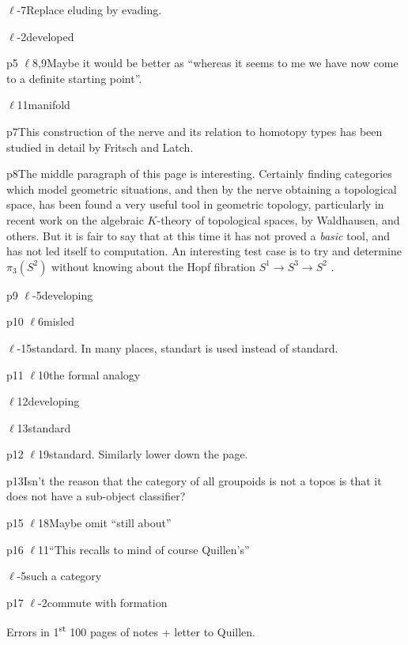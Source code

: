 $\ell$-7\qquad Replace eluding by evading.

$\ell$-2\qquad developed

p5 $\ell$8,9\quad Maybe it would be better as ``whereas it seems to me we have now come to a definite starting point''.

$\ell$11\qquad manifold

p7\qquad This construction of the nerve and its relation to homotopy types has been studied in detail by Fritsch and Latch.

p8\qquad The middle paragraph of this page is interesting. Certainly finding categories which model geometric situations, and then by the nerve obtaining a topological
space, has been found a very useful tool in geometric topology, particularly in recent work on the algebraic $K$-theory of topological spaces, by Waldhausen, and others. But it is fair to say that at this time it has not proved a \textit{basic} tool, and has not led itself to computation. An interesting test case is to try and determine $\pi_{3}(S^{2})$ without knowing about the Hopf fibration $S^{1}\to S^{3}\to S^{2}$ .

p9 $\ell$-5\qquad developing

p10 $\ell$6\qquad misled

$\ell$-15\quad standard. In many places, standart is used instead of standard.

p11 $\ell$10\quad the formal analogy

$\ell$12\qquad developing

$\ell$13\qquad standard

p12 $\ell$19\quad standard. Similarly lower down the page.

p13\qquad Isn't the reason that the category of all groupoids is not a topos is that it does not have a sub-object classifier?

p15 $\ell$18\quad Maybe omit ``still about''

p16 $\ell$11\quad ``This recalls to mind of course Quillen's''

$\ell$-5\qquad such a category

p17 $\ell$-2\quad commute with formation


\begin{center}Errors in 1\textsuperscript{st} 100 pages of notes + letter to Quillen.\end{center}

